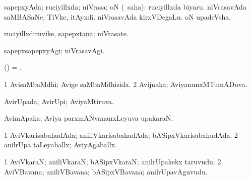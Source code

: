 \bentry
{}
\gl{\nA}
\expl{}
\bmng
\emng
\eentry

\bentry
{}
\gl{\nA}
\expl{}
\bmng
\emng
\eentry

\bentry
{} 
\gl{\gu}
\expl{}
\bmng
 sapepxyAda; ruciyillxda; niVrasa; oN (\rUpa\ saha):  ruciyillxda biyaru.  niVrasavAda saMBASaNe, TiVke, itAyxdi.  niVrasavAda kirxVDegaLu.  oN upadeVsha. 
\emng
\eentry

\bentry
{} 
\gl{\nA}
\expl{}
\bmng
 ruciyillxdiruvike, sapepxtana; niVrasate. 
\emng
\eentry

\bentry
{} 
\gl{\kirxvi}
\expl{}
\bmng
 sapepxsapepxyAgi; niVrasavAgi. 
\emng
\eentry

\bentry
{} 
\gl{\nA}
\expl{}
\bmng
\emng
\eentry

\bentry
{} 
\gl{\nA}
\expl{}
\bmng
 (\ame) = . 
\emng
\eentry

\bentry
{} 
\gl{\gu}
\expl{}
\bmng
\bnum
\num{1} AvisaMbaMdhi; Avige saMbaMdhisida. 
\num{2} Avijnaka; AviyanunxMTumADuva. 
\enum
\emng
\eentry

\bentry
{} 
\gl{\gu}
\expl{}
\bmng
 AvirUpada; AvirUpi; AviyaMtiruva. 
\emng
\eentry

\bentry
{} 
\gl{\nA}
\expl{}
\bmng
 AvimApaka; Aviya parxmANvananxLeyuva upakaraN. 
\emng
\eentry

\bentry
{} 
\gl{\kirx}
\expl{}
\bmng
\emng
\eentry

\bentry
{} 
\gl{\gu}
\expl{}
\bmng
\bnum
\num{1} AviVkarisabahudAda; aniliVkarisabahudAda; bASipxVkarisabahudAda. 
\num{2} anilrUpa taLeyaballx; AviyAgaballx. 
\enum
\emng
\eentry

\bentry
{} 
\gl{\nA}
\expl{}
\bmng
\bnum
\num{1} AviVkaraN; aniliVkaraN; bASipxVkaraN; anilrUpakekx taruvudu. 
\num{2} AviVBavana; aniliVBavana; bASipxVBavana; anilrUpavAguvudu. 
\enum
\emng
\eentry

